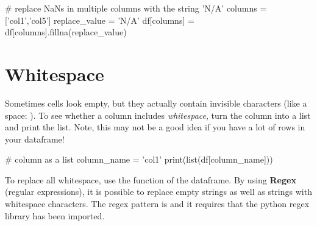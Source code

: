 \begin{pycode}
    # replace NaNs in multiple columns with the string 'N/A'
    columns = ['col1','col5']
    replace_value = 'N/A'
    df[columns] = df[columns].fillna(replace_value)
\end{pycode}



\section{Whitespace}

Sometimes cells look empty, but they actually contain invisible characters (like a space: ). To see whether a column includes \textit{whitespace}, turn the column into a list and print the list. Note, this may not be a good idea if you have a lot of rows in your dataframe!

\begin{pycode}
    # column as a list
    column_name = 'col1'
    print(list(df[column_name]))
\end{pycode}

To replace all whitespace, use the  function of the dataframe. By using \textbf{Regex} (regular expressions), it is possible to replace empty strings as well as strings with whitespace characters. The regex pattern is  and it requires that the python regex library has been imported.


